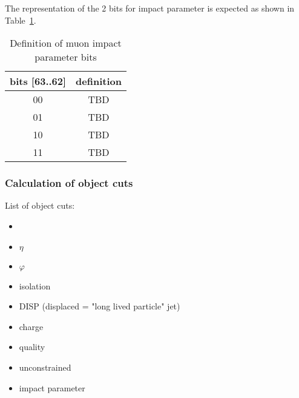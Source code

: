 The representation of the 2 bits for impact parameter is expected as shown in Table~\ref{tab:gtl:muon_iso_bits}.\\

\begin{table}[ht]
\caption{Definition of muon impact parameter bits}
\vspace{5mm}
\centering
\begin{tabular}{|c|c|}\hline
bits [63..62] & definition \\\hline\hline
00 & TBD \\
01 & TBD \\
10 & TBD \\
11 & TBD \\\hline
\end{tabular}
\label{tab:gtl:muon_iso_bits}
\end{table}

\clearpage

\subsubsection{Calculation of object cuts}
\label{sec:gtl:calc_obj_cuts}

List of object cuts:
\begin{itemize}
\item \pt
\item $\eta$
\item $\varphi$
\item isolation
\item DISP (displaced = "long lived particle" jet)
\item charge
\item quality
\item unconstrained \pt
\item impact parameter
\end{itemize}

